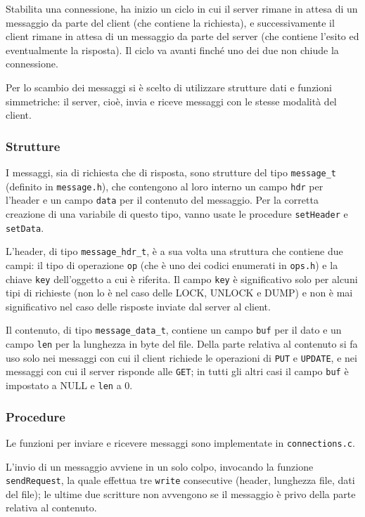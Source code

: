 \documentclass[a4paper,12pt]{article}
\begin{document}
Stabilita una connessione, ha inizio un ciclo in cui il server rimane in attesa di un messaggio da parte del client (che contiene la richiesta), e successivamente il client rimane in attesa di un messaggio da parte del server (che contiene l'esito ed eventualmente la risposta). Il ciclo va avanti finché uno dei due non chiude la connessione.

Per lo scambio dei messaggi si è scelto di utilizzare strutture dati e funzioni simmetriche: il server, cioè, invia e riceve messaggi con le stesse modalità del client.

\subsubsection*{Strutture}

I messaggi, sia di richiesta che di risposta, sono strutture del tipo \texttt{message\_t} (definito in \texttt{message.h}), che contengono al loro interno un campo \texttt{hdr} per l'header e un campo \texttt{data} per il contenuto del messaggio. Per la corretta creazione di una variabile di questo tipo, vanno usate le procedure \texttt{setHeader} e \texttt{setData}.

L'header, di tipo \texttt{message\_hdr\_t}, è a sua volta una struttura che contiene due campi: il tipo di operazione \texttt{op} (che è uno dei codici enumerati in \texttt{ops.h}) e la chiave \texttt{key} dell'oggetto a cui è riferita. Il campo \texttt{key} è significativo solo per alcuni tipi di richieste (non lo è nel caso delle LOCK, UNLOCK e DUMP) e non è mai significativo nel caso delle risposte inviate dal server al client.

Il contenuto, di tipo \texttt{message\_data\_t}, contiene un campo \texttt{buf} per il dato e un campo \texttt{len} per la lunghezza in byte del file. Della parte relativa al contenuto si fa uso solo nei messaggi con cui il client richiede le operazioni di \texttt{PUT} e \texttt{UPDATE}, e nei messaggi con cui il server risponde alle \texttt{GET}; in tutti gli altri casi il campo \texttt{buf} è impostato a NULL e \texttt{len} a 0.

\subsubsection*{Procedure}

Le funzioni per inviare e ricevere messaggi sono implementate in \texttt{connections.c}.

L'invio di un messaggio avviene in un solo colpo, invocando la funzione \texttt{sendRequest}, la quale effettua tre \texttt{write} consecutive (header, lunghezza file, dati del file); le ultime due scritture non avvengono se il messaggio è privo della parte relativa al contenuto.
\end{document}

